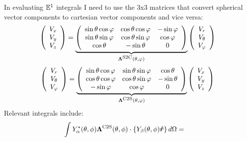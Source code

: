 \documentclass[letterpaper]{article}
\begin{document}
In evaluating $\mathbb{E}^1$ integrals I need to use the 3x3 matrices
that convert spherical vector components to cartesian vector components
and vice versa:
$$ \left(\begin{array}{c}V_x \\ V_y \\ V_z\end{array}\right)
  =
   \underbrace{
   \left(\begin{array}{ccc}
   \sin\theta\cos\varphi & \cos\theta \cos \varphi & -\sin\varphi \\
   \sin\theta\sin\varphi & \cos\theta \sin \varphi & \cos\varphi \\
   \cos\theta & -\sin\theta & 0
   \end{array}\right)
              }_{\boldsymbol{\Lambda}^{\text{\scriptsize S2C}}(\theta,\varphi)}
   \left(\begin{array}{c}V_r \\ V_\theta \\ V_\varphi\end{array}\right)
$$
$$ \left(\begin{array}{c}V_r \\ V_\theta \\ V_\varphi\end{array}\right)
  =
   \underbrace{
   \left(\begin{array}{ccc}
   \sin\theta\cos\varphi & \sin\theta \sin \varphi & \cos\theta \\
   \cos\theta\cos\varphi & \cos\theta \sin\varphi  & -\sin\theta \\
   -\sin\varphi & \cos\varphi & 0
   \end{array}\right)
              }_{\boldsymbol{\Lambda}^{\text{\scriptsize C2S}}(\theta,\varphi)}
   \left(\begin{array}{c}V_x \\ V_y \\ V_z \end{array}\right)
$$
Relevant integrals include:
\begin{align*}
  \int 
   Y^*_\alpha(\theta,\phi) \boldsymbol{\Lambda}^{\text{\scriptsize C2S}}(\theta,\phi)
   \cdot \left\{ Y_\beta(\theta,\phi)\boldsymbol{\hat{r}}\right\}
   d\Omega
&=
\end{align*}

 
\end{document}
